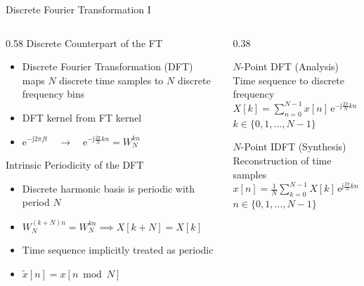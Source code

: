 \begin{frame}{Discrete Fourier Transformation I}
\begin{columns}[T,onlytextwidth]
    \begin{column}{0.58\textwidth}
        Discrete Counterpart of the FT\\
        \begin{itemize}
            \item Discrete Fourier Transformation (DFT) maps $N$ discrete time samples to $N$ discrete frequency bins
            \item DFT kernel from FT kernel
            \item $\mathrm{e}^{-\mathrm{j} 2\pi f t} \quad\longrightarrow\quad \mathrm{e}^{-\mathrm{j} \frac{2\pi}{N} k n} = W_N^{k n}$
        \end{itemize}
        Intrinsic Periodicity of the DFT
        \begin{itemize}
            \item Discrete harmonic basis is periodic with period $N$
            \item $W_N^{(k + N)n} = W_N^{kn} \implies X[k + N] = X[k]$
            \item Time sequence implicitly treated as periodic
            \item $\tilde{x}[n] = x[n \bmod N]$
        \end{itemize}
    \end{column}

    \begin{column}{0.38\textwidth}
        \begin{block}{$N$-Point DFT (Analysis)}
            Time sequence to discrete frequency\\
            \vspace{0.4em}
            \centering
            $X[k] = \sum_{n=0}^{N-1} x[n] \,\mathrm{e}^{-\mathrm{j} \frac{2\pi}{N} k n}$ \\[0.2cm]
            \footnotesize $k \in \{0, 1, \dots, N-1\}$
        \end{block}

        \begin{block}{$N$-Point IDFT (Synthesis)}
            Reconstruction of time samples\\
            \vspace{0.4em}
            \centering
            $x[n] = \frac{1}{N}\sum_{k=0}^{N-1} X[k] \,\mathrm{e}^{\mathrm{j} \frac{2\pi}{N} k n}$ \\[0.2cm]
            \footnotesize $n \in \{0, 1, \dots, N-1\}$
        \end{block}
    \end{column}
\end{columns}
\end{frame}

